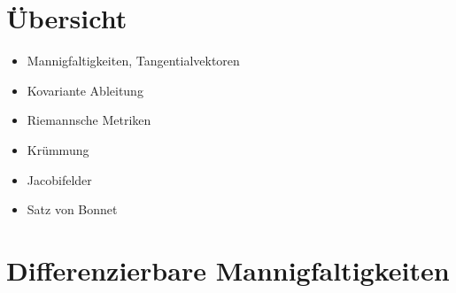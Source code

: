 
\section*{Übersicht}

\begin{itemize}
\item Mannigfaltigkeiten, Tangentialvektoren
\item Kovariante Ableitung
\item Riemannsche Metriken
\item Krümmung
\item Jacobifelder
\item Satz von Bonnet
\end{itemize}

\section{Differenzierbare Mannigfaltigkeiten}

